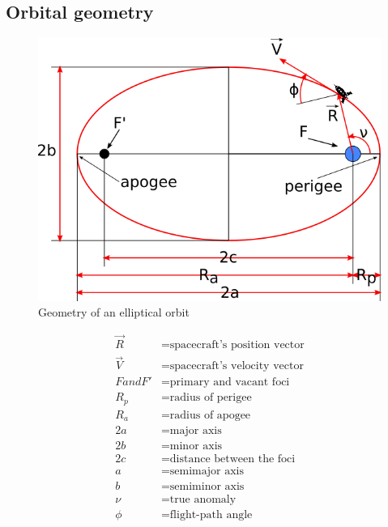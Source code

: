 \documentclass{article}
\begin{document}
\subsection{Orbital geometry}

\begin{minipage}{0.6\textwidth}
	\begin{figure}[H]
		\centering
		\includegraphics[width=0.9\linewidth]{img/ellipse}
		\caption{Geometry of an elliptical orbit}
		\label{fig:coordinate_system}
	\end{figure}
\end{minipage} \hfill
\begin{minipage}{0.35\textwidth}
	\begin{align*}
	\vec{R} &= \text{spacecraft's position vector}\\
	\vec{V} &= \text{spacecraft's velocity vector}\\
	F and F' &= \text{primary and vacant foci}\\
	R_{p} &= \text{radius of perigee}\\
	R_{a} &= \text{radius of apogee}\\
	2a &= \text{major axis}\\
	2b &= \text{minor axis}\\
	2c &= \text{distance between the foci}\\
	a &= \text{semimajor axis}\\
	b &= \text{semiminor axis}\\
	\nu &= \text{true anomaly}\\
	\phi &= \text{flight-path angle}\\
	\end{align*}
\end{minipage}
\end{document}
